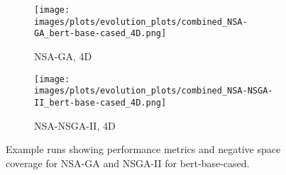 \begin{figure}[htbp]
    \vspace{0.2cm}
    \begin{subfigure}[b]{0.40\textwidth}
        \texttt{[image: images/plots/evolution\_plots/combined\_NSA-GA\_bert-base-cased\_4D.png]}
        \caption{\scriptsize NSA-GA, 4D}
        \label{subfig:bert-base-cased_NSA-GA_4D}
        \end{subfigure}\hspace{0.05\textwidth}
    \begin{subfigure}[b]{0.40\textwidth}
        \texttt{[image: images/plots/evolution\_plots/combined\_NSA-NSGA-II\_bert-base-cased\_4D.png]}
        \caption{\scriptsize NSA-NSGA-II, 4D}
        \label{subfig:bert-base-cased_NSA-NSGA-II_4D}
        \end{subfigure}
    \caption{\small Example runs showing performance metrics and negative space coverage for NSA-GA and NSGA-II for bert-base-cased.}
        \label{fig:evolution_plots_bert-base-cased}
        \end{figure}
        